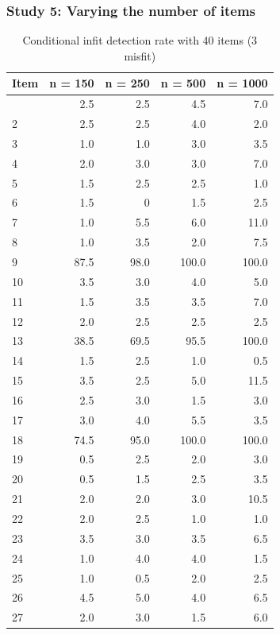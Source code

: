 \documentclass[
  letterpaper,
  DIV=11,
  numbers=noendperiod]{scrartcl}
\begin{document}
\subsubsection{Study 5: Varying the number of
items}\label{study-5-varying-the-number-of-items-1}

\begin{longtable}[]{@{}lrrrr@{}}

\caption{\label{tbl-ifb40}Conditional infit detection rate with 40 items
(3 misfit)}

\tabularnewline

\toprule\noalign{}
Item & n = 150 & n = 250 & n = 500 & n = 1000 \\
\midrule\noalign{}
\endhead
\bottomrule\noalign{}
\endlastfoot
1 & 2.5 & 2.5 & 4.5 & 7.0 \\
2 & 2.5 & 2.5 & 4.0 & 2.0 \\
3 & 1.0 & 1.0 & 3.0 & 3.5 \\
4 & 2.0 & 3.0 & 3.0 & 7.0 \\
5 & 1.5 & 2.5 & 2.5 & 1.0 \\
6 & 1.5 & 0 & 1.5 & 2.5 \\
7 & 1.0 & 5.5 & 6.0 & 11.0 \\
8 & 1.0 & 3.5 & 2.0 & 7.5 \\
9 & 87.5 & 98.0 & 100.0 & 100.0 \\
10 & 3.5 & 3.0 & 4.0 & 5.0 \\
11 & 1.5 & 3.5 & 3.5 & 7.0 \\
12 & 2.0 & 2.5 & 2.5 & 2.5 \\
13 & 38.5 & 69.5 & 95.5 & 100.0 \\
14 & 1.5 & 2.5 & 1.0 & 0.5 \\
15 & 3.5 & 2.5 & 5.0 & 11.5 \\
16 & 2.5 & 3.0 & 1.5 & 3.0 \\
17 & 3.0 & 4.0 & 5.5 & 3.5 \\
18 & 74.5 & 95.0 & 100.0 & 100.0 \\
19 & 0.5 & 2.5 & 2.0 & 3.0 \\
20 & 0.5 & 1.5 & 2.5 & 3.5 \\
21 & 2.0 & 2.0 & 3.0 & 10.5 \\
22 & 2.0 & 2.5 & 1.0 & 1.0 \\
23 & 3.5 & 3.0 & 3.5 & 6.5 \\
24 & 1.0 & 4.0 & 4.0 & 1.5 \\
25 & 1.0 & 0.5 & 2.0 & 2.5 \\
26 & 4.5 & 5.0 & 4.0 & 6.5 \\
27 & 2.0 & 3.0 & 1.5 & 6.0 \\

\end{longtable}
\end{document}
